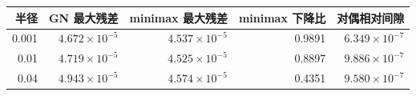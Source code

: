 \begin{tabular}{rrrrr}
\toprule
半径 & GN 最大残差 & minimax 最大残差 & minimax 下降比 & 对偶相对间隙 \\
\midrule
0.001 & $4.672\times10^{-5}$ & $4.537\times10^{-5}$ & 0.9891 & $6.349\times10^{-7}$ \\
0.01 & $4.719\times10^{-5}$ & $4.525\times10^{-5}$ & 0.8897 & $9.886\times10^{-7}$ \\
0.04 & $4.943\times10^{-5}$ & $4.574\times10^{-5}$ & 0.4351 & $9.580\times10^{-7}$ \\
\bottomrule
\end{tabular}
